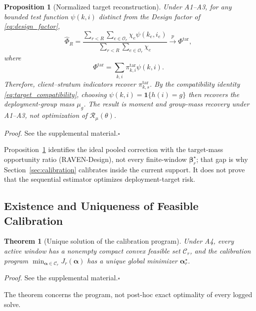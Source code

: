 \documentclass[letterpaper,journal]{IEEEtran}
\newtheorem{theorem}{Theorem}
\newtheorem{proposition}{Proposition}
\begin{document}
\begin{proposition}[Normalized target reconstruction]
\label{prop:reconstruction}
Under A1--A3, for any bounded test function $\psi(k,i)$ distinct from the
Design factor of \eqref{eq:design_factor},
\begin{equation}
 \widehat\Phi_R
 =
 \frac{
 \sum_{r<R}
 \sum_{e\in\mathcal{O}_r}
 \chi_e\psi(k_e,i_e)
 }{
 \sum_{r<R}
 \sum_{e\in\mathcal{O}_r}
 \chi_e
 }
 \xrightarrow{p}
 \Phi^{\mathrm{tar}},
 \label{eq:hajek_phi}
\end{equation}
where
\begin{equation}
 \Phi^{\mathrm{tar}}
 =
 \sum_{k,i}
 \pi^{\mathrm{tar}}_{k,i}\psi(k,i).
 \label{eq:target_phi}
\end{equation}
Therefore, client--stratum indicators recover
$\pi^{\mathrm{tar}}_{k,s}$.  By the compatibility identity
\eqref{eq:target_compatibility}, choosing
$\psi(k,i)=\mathbf{1}\{h(i)=g\}$ then recovers the deployment-group mass
$\mu_g$.  The result is moment and group-mass recovery under A1--A3, not
optimization of $\mathcal{R}_{\mu}(\theta)$.
\end{proposition}

\noindent\emph{Proof.}
See the supplemental material.\hfill$\square$

Proposition~\ref{prop:reconstruction} identifies the ideal pooled correction
with the target-mass opportunity ratio (RAVEN-Design),
not every finite-window $\boldsymbol\beta_r^\star$; that gap is why
Section~\ref{sec:calibration} calibrates inside the current support.
It does not prove that the sequential estimator optimizes deployment-target
risk.

\subsection{Existence and Uniqueness of Feasible Calibration}
\label{subsec:theorem_calibration}

\begin{theorem}[Unique solution of the calibration program]
\label{thm:calibration}
Under A4, every active window has a nonempty compact convex feasible set
$\mathcal{C}_r$, and the calibration program
$\min_{\boldsymbol\alpha\in\mathcal{C}_r}J_r(\boldsymbol\alpha)$
has a unique global minimizer $\boldsymbol\alpha_r^\star$.
\end{theorem}

\noindent\emph{Proof.}
See the supplemental material.\hfill$\square$

The theorem concerns the program, not post-hoc exact optimality of every
logged solve.
\end{document}
